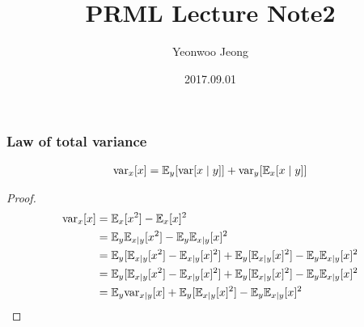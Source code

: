 \documentclass[10pt,mathserif]{beamer}
\title{PRML Lecture Note2}
\author{Yeonwoo Jeong}
\institute
    {Seoul National University}
\date{2017.09.01}
\begin{document}
\begin{frame}
  \titlepage
\end{frame}

\begin{frame}
    \frametitle{Law of total variance}
    \begin{align}
        \mathrm{var}_x[x] = \mathbb{E}_y[\mathrm{var}[x\mid y]] + \mathrm{var}_y[\mathbb{E}_x[x\mid y]] \nonumber
    \end{align}
    \begin{proof}
        \begin{align}
            \mathrm{var}_x[x] &= \mathbb{E}_x[x^2] - \mathbb{E}_x[x]^2 \nonumber\\
            &= \mathbb{E}_y\mathbb{E}_{x\mid y}[x^2] - \mathbb{E}_y \mathbb{E}_{x\mid y} [x]^2 \nonumber\\
            &= \mathbb{E}_y[\mathbb{E}_{x\mid y}[x^2] - \mathbb{E}_{x\mid y} [x]^2]+\mathbb{E}_y[\mathbb{E}_{x\mid y}[x]^2] - \mathbb{E}_y \mathbb{E}_{x|y}[x]^2 \nonumber\\
            &= \mathbb{E}_y[\mathbb{E}_{x\mid y}[x^2] - \mathbb{E}_{x\mid y} [x]^2]+\mathbb{E}_y[\mathbb{E}_{x\mid y}[x]^2] - \mathbb{E}_y \mathbb{E}_{x|y}[x]^2 \nonumber\\
            &= \mathbb{E}_y \mathrm{var}_{x\mid y}[x] + \mathbb{E}_y[\mathbb{E}_{x\mid y}[x]^2] - \mathbb{E}_y \mathbb{E}_{x|y}[x]^2 \nonumber
        \end{align}
    \end{proof}
\end{frame}
\end{document}
